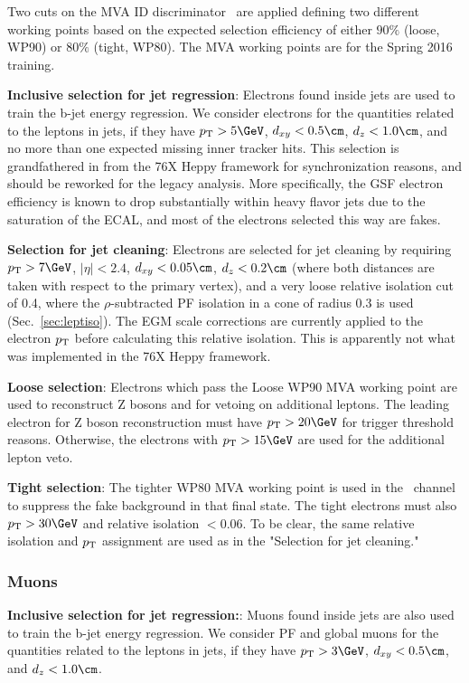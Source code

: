   Two cuts on the MVA ID discriminator~\cite{MVAeID} are applied
  defining two different working points based on the expected selection efficiency
  of either $90\%$ (loose, WP90) or $80\%$ (tight, WP80). The MVA working points are for the Spring 2016 training.
  
  \textbf{Inclusive selection for jet regression}: Electrons found inside jets are used to train the b-jet energy regression.
  We consider electrons for the quantities related to the leptons in jets,
  if they have $\pt > 5 \GeV$, $d_{xy}<0.5\cm$, $d_z<1.0\cm$, and no more than one expected missing
  inner tracker hits. 
  This selection is grandfathered in from the 76X Heppy framework for synchronization reasons,
  and should be reworked for the legacy analysis.
  More specifically, the GSF electron efficiency is known to drop substantially within heavy flavor jets
  due to the saturation of the ECAL, and most of the electrons selected this way are fakes.
  
  \textbf{Selection for jet cleaning}:
  Electrons are selected for jet cleaning by requiring $\pt>7\GeV$, $|\eta|<2.4$, $d_{xy}<0.05\cm$, $d_z<0.2\cm$ 
  (where both distances are taken with respect to the primary vertex), and a very loose relative
  isolation cut of 0.4, where the $\rho$-subtracted PF isolation in a cone of radius $0.3$ is used (Sec.~\ref{sec:leptiso}).
  The EGM scale corrections are currently applied to the electron $p_{\mathrm{T}}$ before calculating this relative isolation.
  This is apparently not what was implemented in the 76X Heppy framework.

  \textbf{Loose selection}:
  Electrons which pass the Loose WP90 MVA working point are used to reconstruct Z bosons and for vetoing on additional leptons.
  The leading electron for Z boson reconstruction must have $\pt > 20\GeV$ for trigger threshold reasons.
  Otherwise, the electrons with $\pt > 15\GeV$ are used for the additional lepton veto.

  \textbf{Tight selection}:
  The tighter WP80 MVA working point is used in the \WenH\ channel to suppress the fake background in
  that final state. The tight electrons must also $\pt > 30\GeV$ and relative isolation $< 0.06$.
  To be clear, the same relative isolation and $p_{\mathrm{T}}$ assignment are used as in the "Selection for jet cleaning."

\subsubsection{Muons}
  \textbf{Inclusive selection for jet regression:}:
  Muons found inside jets are also used to train the b-jet energy regression.
  We consider PF and global muons for the quantities related to the leptons in jets,
  if they have $\pt > 3 \GeV$, $d_{xy}<0.5\cm$, and $d_z<1.0\cm$.
  
